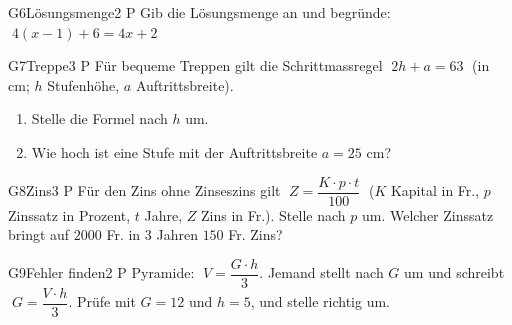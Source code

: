 \documentclass[11pt]{article}
\begin{document}
\begin{lpaufgabe}{G6}{Lösungsmenge}{2 P}
Gib die Lösungsmenge an und begründe: $\;4(x - 1) + 6 = 4x + 2$
\end{lpaufgabe}


\begin{lpaufgabe}{G7}{Treppe}{3 P}
Für bequeme Treppen gilt die Schrittmassregel $\;2h + a = 63\;$ (in cm; $h$ Stufenhöhe, $a$ Auftrittsbreite).
\begin{enumerate}[label=(\alph*),leftmargin=*,itemsep=3pt]
\item Stelle die Formel nach $h$ um.
\item Wie hoch ist eine Stufe mit der Auftrittsbreite $a = 25$ cm?
\end{enumerate}
\end{lpaufgabe}

\begin{lpaufgabe}{G8}{Zins}{3 P}
Für den Zins ohne Zinseszins gilt $\;Z = \dfrac{K \cdot p \cdot t}{100}\;$ ($K$ Kapital in Fr., $p$ Zinssatz in Prozent, $t$ Jahre, $Z$ Zins in Fr.).
Stelle nach $p$ um. Welcher Zinssatz bringt auf $2000$ Fr. in $3$ Jahren $150$ Fr. Zins?
\end{lpaufgabe}

\begin{lpaufgabe}{G9}{Fehler finden}{2 P}
Pyramide: $\;V = \dfrac{G \cdot h}{3}$. Jemand stellt nach $G$ um und schreibt $\;G = \dfrac{V \cdot h}{3}$.
Prüfe mit $G = 12$ und $h = 5$, und stelle richtig um.
\end{lpaufgabe}
\end{document}
